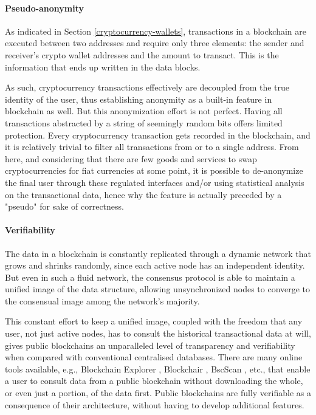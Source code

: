 \documentclass[../access.tex]{subfiles}
\begin{document}
        \paragraph{Pseudo-anonymity}
            \label{blockchain-anonymity}
            As indicated in Section \ref{cryptocurrency-wallets}, transactions in a blockchain are executed between two addresses and require only three elements: the sender and receiver's crypto wallet addresses and the amount to transact. This is the information that ends up written in the data blocks.
            \par
            As such, cryptocurrency transactions effectively are decoupled from the true identity of the user, thus establishing anonymity as a built-in feature in blockchain as well. But this anonymization effort is not perfect. Having all transactions abstracted by a string of seemingly random bits offers limited protection. Every cryptocurrency transaction gets recorded in the blockchain, and it is relatively trivial to filter all transactions from or to a single address. From here, and considering that there are few goods and services to swap cryptocurrencies for fiat currencies at some point, it is possible to de-anonymize the final user through these regulated interfaces and/or using statistical analysis on the transactional data, hence why the feature is actually preceded by a "pseudo" for sake of correctness.
    
        \paragraph{Verifiability}
        \label{blockchain-verifiability}
            The data in a blockchain is constantly replicated through a dynamic network that grows and shrinks randomly, since each active node has an independent identity. But even in such a fluid network, the consensus protocol is able to maintain a unified image of the data structure, allowing unsynchronized nodes to converge to the consensual image among the network's majority.
            \par
            This constant effort to keep a unified image, coupled with the freedom that any user, not just active nodes, has to consult the historical transactional data at will, gives public blockchains an unparalleled level of transparency and verifiability when compared with conventional centralised databases. There are many online tools available, e.g., Blockchain Explorer \cite{blockchainexplorer2023}, Blockchair \cite{blockchair2023}, BscScan \cite{bscscan2023}, etc., that enable a user to consult data from a public blockchain without downloading the whole, or even just a portion, of the data first. Public blockchains are fully verifiable as a consequence of their architecture, without having to develop additional features.
    
\end{document}

